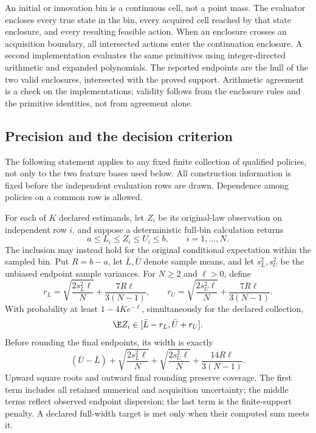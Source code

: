 An initial or innovation bin is a continuous cell, not a point mass. The evaluator encloses every true state in the bin, every acquired cell reached by that state enclosure, and every resulting feasible action. When an enclosure crosses an acquisition boundary, all intersected actions enter the continuation enclosure. A second implementation evaluates the same primitives using integer-directed arithmetic and expanded polynomials. The reported endpoints are the hull of the two valid enclosures, intersected with the proved support. Arithmetic agreement is a check on the implementations; validity follows from the enclosure rules and the primitive identities, not from agreement alone.

\subsection{Precision and the decision criterion}
The following statement applies to any fixed finite collection of qualified policies, not only to the two feature bases used below. All construction information is fixed before the independent evaluation rows are drawn. Dependence among policies on a common row is allowed.

\begin{theorem}\label{thm:precision77}
For each of $K$ declared estimands, let $Z_i$ be its original-law observation on independent row $i$, and suppose a deterministic full-bin calculation returns
\[
 a\le L_i\le Z_i\le U_i\le b,\qquad i=1,\ldots,N.
\]
The inclusion may instead hold for the original conditional expectation within the sampled bin. Put $R=b-a$, let $\bar L,\bar U$ denote sample means, and let $s_L^2,s_U^2$ be the unbiased endpoint sample variances. For $N\ge2$ and $\ell>0$, define
\[
 r_L=\sqrt{\frac{2s_L^2\ell}{N}}+\frac{7R\ell}{3(N-1)},\qquad
 r_U=\sqrt{\frac{2s_U^2\ell}{N}}+\frac{7R\ell}{3(N-1)}.
\]
With probability at least $1-4K e^{-\ell}$, simultaneously for the declared collection,
\begin{equation}\label{eq:interval77}
 \E Z_i\in[\bar L-r_L,\bar U+r_U].
\end{equation}
Before rounding the final endpoints, its width is exactly
\begin{equation}\label{eq:width77}
 (\bar U-\bar L)
 +\sqrt{\frac{2s_L^2\ell}{N}}+\sqrt{\frac{2s_U^2\ell}{N}}
 +\frac{14R\ell}{3(N-1)}.
\end{equation}
Upward square roots and outward final rounding preserve coverage. The first term includes all retained numerical and acquisition uncertainty; the middle terms reflect observed endpoint dispersion; the last term is the finite-support penalty. A declared full-width target is met only when their computed sum meets it.
\end{theorem}

